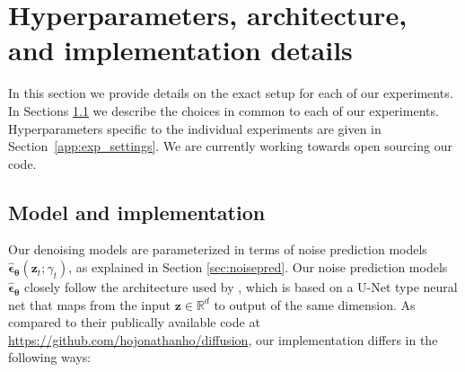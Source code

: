 \documentclass{article}
\def\rvz{{\mathbf{z}}}
\newcommand{\bT}{{\boldsymbol{\theta}}}
\newcommand{\bepsilon}{{\boldsymbol{\epsilon}}}
\begin{document}
\section{Hyperparameters, architecture, and implementation details}
\label{sec:hps}
In this section we provide details on the exact setup for each of our experiments. In Sections \ref{app:model} we describe the choices in common to each of our experiments. Hyperparameters specific to the individual experiments are given in Section~\ref{app:exp_settings}. We are currently working towards open sourcing our code.

\subsection{Model and implementation}
\label{app:model}
Our denoising models are parameterized in terms of noise prediction models $\hat{\bepsilon}_{\bT}(
\rvz_{t}; \gamma_t)$, as explained in Section \ref{sec:noisepred}. Our noise prediction models $\hat{\bepsilon}_{\bT}$ closely follow the architecture used by \cite{ho2020denoising}, which is based on a U-Net type neural net \citep{ronneberger2015u} that maps from the input $\rvz \in \mathbb{R}^{d}$ to output of the same dimension. As compared to their publically available code at \url{https://github.com/hojonathanho/diffusion}, our implementation differs in the following ways:
\end{document}
